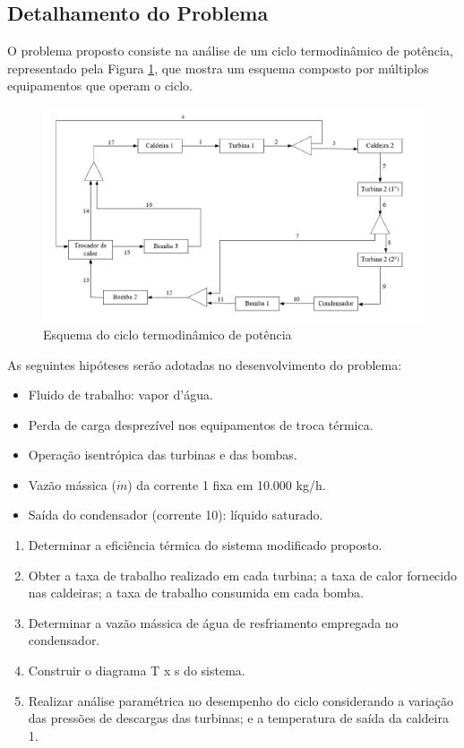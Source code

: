 \documentclass[
	article,			%
	11pt,				%
	oneside,			%
	a4paper,			%
	english,			%
	brazil,				%
	sumario=tradicional
	]{abntex2}
\begin{document}
\subsection{Detalhamento do Problema}

O problema proposto consiste na análise de um ciclo termodinâmico de potência, representado pela Figura \ref{fig:esquema-problema}, que mostra um esquema composto por múltiplos equipamentos que operam o ciclo.

\begin{figure}[h]
	\centering
	\includegraphics[width=1.0\textwidth]{./images/esquema-problema.png}
	\caption{Esquema do ciclo termodinâmico de potência}
	\label{fig:esquema-problema}
\end{figure}

As seguintes hipóteses serão adotadas no desenvolvimento do problema:

\begin{itemize}
	\item Fluido de trabalho: vapor d’água.
	\item Perda de carga desprezível nos equipamentos de troca térmica.
	\item Operação isentrópica das turbinas e das bombas.
	\item Vazão mássica ($\dot{m}$) da corrente 1 fixa em 10.000 kg/h.
	\item Saída do condensador (corrente 10): líquido saturado.
\end{itemize}

\begin{enumerate}
	\item Determinar a eficiência térmica do sistema modificado proposto.
	\item Obter a taxa de trabalho realizado em cada turbina; a taxa de calor fornecido nas caldeiras; a taxa de trabalho consumida em cada bomba.
	\item Determinar a vazão mássica de água de resfriamento empregada no condensador.
	\item Construir o diagrama T x s do sistema.
	\item Realizar análise paramétrica no desempenho do ciclo considerando a variação das pressões de descargas das turbinas; e a temperatura de saída da caldeira 1.
\end{enumerate}
\end{document}
